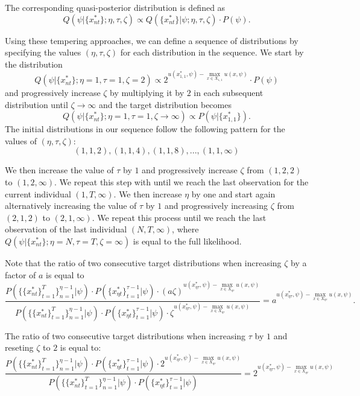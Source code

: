 \documentclass[12pt]{article}
\begin{document}
The corresponding quasi-posterior distribution is defined as
$$ Q(\psi|\{x_{nt}^*\};\eta,\tau,\zeta) \propto Q(\{x_{nt}^*\}|\psi;\eta,\tau,\zeta) \cdot P(\psi) .$$

Using these tempering approaches, we can define a sequence of distributions by specifying the values $(\eta,\tau,\zeta)$ for each distribution in the sequence. We start by the distribution 
$$Q(\psi|\{x_{nt}^*\};\eta=1,\tau=1,\zeta=2) \propto 2^{ u(x_{1,1}^*,\psi) - \max_{x \in X_{1,1}} u(x,\psi)} \cdot P(\psi)$$ 
and progressively increase $\zeta$ by multiplying it by $2$ in each subsequent distribution until $\zeta \to \infty$ and the target distribution becomes
$$ Q(\psi|\{x_{nt}^*\};\eta=1,\tau=1,\zeta \to \infty) \propto  P(\psi|\{x_{1,1}^*\}).$$
The initial distributions in our sequence follow the following pattern for the values of $(\eta,\tau,\zeta)$:
$$(1,1,2),(1,1,4),(1,1,8),...,(1,1,\infty) $$

We then increase the value of $\tau$ by $1$ and progressively increase $\zeta$ from $(1,2,2)$ to $(1,2,\infty)$. We repeat this step with until we reach the last observation for the current individual $(1,T,\infty)$. We then increase $\eta$ by one and start again alternatively increasing the value of $\tau$ by $1$ and progressively increasing $\zeta$ from $(2,1,2)$ to $(2,1,\infty)$. We repeat this process until we reach the last observation of the last individual $(N,T,\infty)$, where $Q(\psi|\{x_{nt}^*\};\eta=N,\tau=T,\zeta=\infty)$ is equal to the full likelihood.

Note that the ratio of two consecutive target distributions when increasing $\zeta$ by a factor of $a$ is equal to
$$ \frac{P(\{\{x_{nt}^*\}_{t=1}^T\}_{n=1}^{\eta-1}|\psi) \cdot  P(\{x_{\eta t}^*\}_{t=1}^{\tau-1}|\psi) \cdot (a \zeta)^{ u(x_{\eta \tau}^*,\psi) - \max_{x \in X_{\eta \tau}} u(x,\psi)}}{P(\{\{x_{nt}^*\}_{t=1}^T\}_{n=1}^{\eta-1}|\psi) \cdot  P(\{x_{\eta t}^*\}_{t=1}^{\tau-1}|\psi) \cdot \zeta^{ u(x_{\eta \tau}^*,\psi) - \max_{x \in X_{\eta \tau}} u(x,\psi)}} = a^{ u(x_{\eta \tau}^*,\psi) - \max_{x \in X_{\eta \tau}} u(x,\psi)}.$$

The ratio of two consecutive target distributions when increasing $\tau$ by $1$ and reseting $\zeta$ to $2$ is equal to:
$$ \frac{  P(\{\{x_{nt}^*\}_{t=1}^T\}_{n=1}^{\eta-1}|\psi) \cdot  P(\{x_{\eta t}^*\}_{t=1}^{\tau-1}|\psi) \cdot 2^{ u(x_{\eta \tau}^*,\psi) - \max_{x \in X_{\eta \tau}} u(x,\psi)}}{P(\{\{x_{nt}^*\}_{t=1}^T\}_{n=1}^{\eta-1}|\psi) \cdot  P(\{x_{\eta t}^*\}_{t=1}^{\tau-1}|\psi)} = 2^{ u(x_{\eta \tau}^*,\psi) - \max_{x \in X_{\eta \tau}} u(x,\psi)} $$
\end{document}
